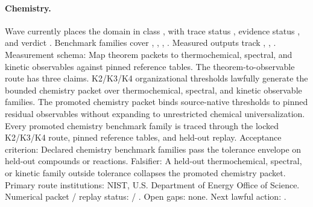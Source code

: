 \paragraph{Chemistry.}
Wave  currently places the domain in class , with trace status , evidence status , and verdict .
Benchmark families cover , \allowbreak {}, \allowbreak {}, \allowbreak {}.
Measured outputs track , \allowbreak {}, \allowbreak {}.
Measurement schema: Map theorem packets to thermochemical, spectral, and kinetic observables against pinned reference tables.
The theorem-to-observable route has three claims. K2/K3/K4 organizational thresholds lawfully generate the bounded chemistry packet over thermochemical, spectral, and kinetic observable families. The promoted chemistry packet binds source-native thresholds to pinned residual observables without expanding to unrestricted chemical universalization. Every promoted chemistry benchmark family is traced through the locked K2/K3/K4 route, pinned reference tables, and held-out replay.
Acceptance criterion: Declared chemistry benchmark families pass the tolerance envelope on held-out compounds or reactions.
Falsifier: A held-out thermochemical, spectral, or kinetic family outside tolerance collapses the promoted chemistry packet.
Primary route institutions: NIST, \allowbreak U.S. Department of Energy Office of Science.
Numerical packet / replay status:  / .
Open gaps: none.
Next lawful action: .

